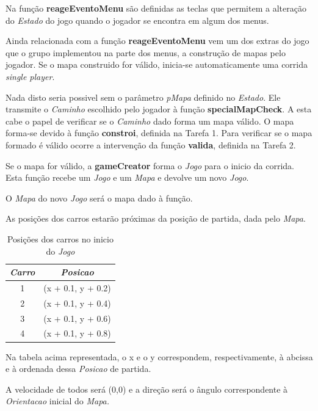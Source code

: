 \documentclass[a4paper]{report} %
\begin{document}
Na função \textbf{reageEventoMenu} são definidas as teclas que permitem a alteração do \emph{Estado} do jogo quando o jogador se encontra em algum dos menus.

Ainda relacionada com a função \textbf{reageEventoMenu} vem um dos extras do jogo que o grupo implementou na parte dos menus, a construção de mapas pelo jogador. Se o mapa construido for válido, inicia-se automaticamente uma corrida \textit{single player}.

Nada disto seria possivel sem o parâmetro \emph{pMapa} definido no \emph{Estado}. Ele transmite o \emph{Caminho} escolhido pelo jogador à função \textbf{specialMapCheck}. A esta cabe o papel de verificar se o \emph{Caminho} dado forma um mapa válido. O mapa forma-se devido à função \textbf{constroi}, definida na Tarefa 1.
Para verificar se o mapa formado é válido ocorre a intervenção da função \textbf{valida}, definida na Tarefa 2.

Se o mapa for válido, a \textbf{gameCreator} forma o \emph{Jogo} para o inicio da corrida. Esta função recebe um \emph{Jogo} e um \emph{Mapa} e devolve um novo \emph{Jogo}. 

O \emph{Mapa} do novo \emph{Jogo} será o mapa dado à função.

As posições dos carros estarão próximas da posição de partida, dada pelo \emph{Mapa}.

\begin{table}[!h]
\begin{center}
\begin{tabular}{|c|c|}
    \hline
  \emph{Carro} & \emph{Posicao} \\
    \hline
  1 & (x + 0.1, y + 0.2) \\
    \hline
  2 & (x + 0.1, y + 0.4) \\
    \hline  
  3 & (x + 0.1, y + 0.6) \\
    \hline
  4 & (x + 0.1, y + 0.8)\\
    \hline

\end{tabular}
\end{center}
\caption{Posições dos carros no inicio do \emph{Jogo}}
\end{table}

Na tabela acima representada, o x e o y correspondem, respectivamente, à abcissa e à ordenada dessa \emph{Posicao} de partida.
 
A velocidade de todos será (0,0) e a direção será o ângulo correspondente à \emph{Orientacao} inicial do \emph{Mapa.}
\end{document}
